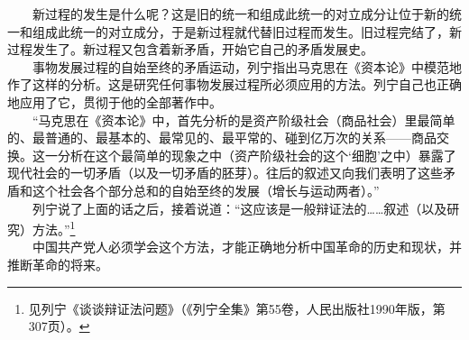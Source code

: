 \documentclass[cn,11pt,chinese]{elegantbook}
\begin{document}
　　新过程的发生是什么呢？这是旧的统一和组成此统一的对立成分让位于新的统一和组成此统一的对立成分，于是新过程就代替旧过程而发生。旧过程完结了，新过程发生了。新过程又包含着新矛盾，开始它自己的矛盾发展史。\\
　　事物发展过程的自始至终的矛盾运动，列宁指出马克思在《资本论》中模范地作了这样的分析。这是研究任何事物发展过程所必须应用的方法。列宁自己也正确地应用了它，贯彻于他的全部著作中。\\
　　“马克思在《资本论》中，首先分析的是资产阶级社会（商品社会）里最简单的、最普通的、最基本的、最常见的、最平常的、碰到亿万次的关系——商品交换。这一分析在这个最简单的现象之中（资产阶级社会的这个‘细胞’之中）暴露了现代社会的一切矛盾（以及一切矛盾的胚芽）。往后的叙述又向我们表明了这些矛盾和这个社会各个部分总和的自始至终的发展（增长与运动两者）。”\\
　　列宁说了上面的话之后，接着说道：“这应该是一般辩证法的……叙述（以及研究）方法。”\footnote[10]{ 见列宁《谈谈辩证法问题》（《列宁全集》第55卷，人民出版社1990年版，第307页）。}\\
　　中国共产党人必须学会这个方法，才能正确地分析中国革命的历史和现状，并推断革命的将来。\\
\end{document}
